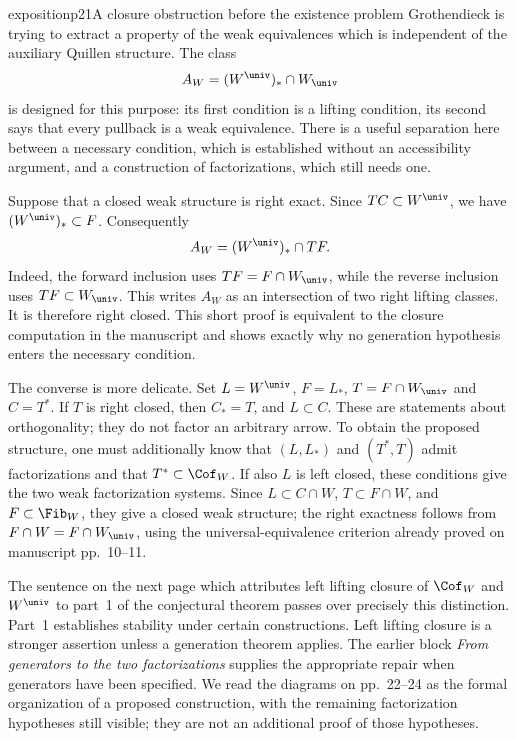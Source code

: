 \begin{dcomment}{exposition}{p21}{A closure obstruction before the existence problem}
Grothendieck is trying to extract a property of the weak equivalences which is independent of the auxiliary Quillen structure. The class
\[
 A_W=(W^{\univ})_*\cap W_{\univ}
\]
is designed for this purpose: its first condition is a lifting condition, its second says that every pullback is a weak equivalence. There is a useful separation here between a necessary condition, which is established without an accessibility argument, and a construction of factorizations, which still needs one.

Suppose that a closed weak structure is right exact. Since $TC\subset W^{\univ}$, we have $(W^{\univ})_*\subset F$. Consequently
\[
 A_W= (W^{\univ})_*\cap TF.
\]
Indeed, the forward inclusion uses $TF=F\cap W_{\univ}$, while the reverse inclusion uses $TF\subset W_{\univ}$. This writes $A_W$ as an intersection of two right lifting classes. It is therefore right closed. This short proof is equivalent to the closure computation in the manuscript and shows exactly why no generation hypothesis enters the necessary condition.

The converse is more delicate. Set $L=W^{\univ}$, $F=L_*$, $T=F\cap W_{\univ}$ and $C=T^*$. If $T$ is right closed, then $C_*=T$, and $L\subset C$. These are statements about orthogonality; they do not factor an arbitrary arrow. To obtain the proposed structure, one must additionally know that $(L,L_*)$ and $(T^*,T)$ admit factorizations and that $T^*\subset\Cof_W$. If also $L$ is left closed, these conditions give the two weak factorization systems. Since $L\subset C\cap W$, $T\subset F\cap W$, and $F\subset\Fib_W$, they give a closed weak structure; the right exactness follows from $F\cap W=F\cap W_{\univ}$, using the universal-equivalence criterion already proved on manuscript pp.~10--11.

The sentence on the next page which attributes left lifting closure of $\Cof_W$ and $W^{\univ}$ to part~1 of the conjectural theorem passes over precisely this distinction. Part~1 establishes stability under certain constructions. Left lifting closure is a stronger assertion unless a generation theorem applies. The earlier block \emph{From generators to the two factorizations} supplies the appropriate repair when generators have been specified. We read the diagrams on pp.~22--24 as the formal organization of a proposed construction, with the remaining factorization hypotheses still visible; they are not an additional proof of those hypotheses.
\end{dcomment}

